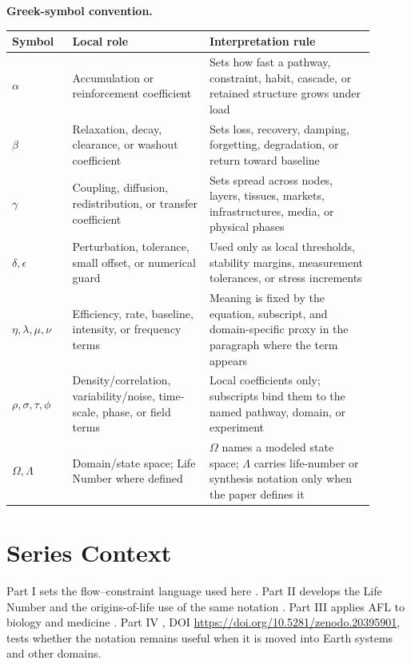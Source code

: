 \documentclass[12pt,a4paper]{article}
\begin{document}
\noindent\textbf{Greek-symbol convention.}
\begin{center}
{\small
\begin{tabular}{p{0.15\linewidth}p{0.34\linewidth}p{0.41\linewidth}}
\hline
Symbol & Local role & Interpretation rule \\
\hline
$\alpha$ & Accumulation or reinforcement coefficient & Sets how fast a pathway, constraint, habit, cascade, or retained structure grows under load \\
$\beta$ & Relaxation, decay, clearance, or washout coefficient & Sets loss, recovery, damping, forgetting, degradation, or return toward baseline \\
$\gamma$ & Coupling, diffusion, redistribution, or transfer coefficient & Sets spread across nodes, layers, tissues, markets, infrastructures, media, or physical phases \\
$\delta,\epsilon$ & Perturbation, tolerance, small offset, or numerical guard & Used only as local thresholds, stability margins, measurement tolerances, or stress increments \\
$\eta,\lambda,\mu,\nu$ & Efficiency, rate, baseline, intensity, or frequency terms & Meaning is fixed by the equation, subscript, and domain-specific proxy in the paragraph where the term appears \\
$\rho,\sigma,\tau,\phi$ & Density/correlation, variability/noise, time-scale, phase, or field terms & Local coefficients only; subscripts bind them to the named pathway, domain, or experiment \\
$\Omega,\Lambda$ & Domain/state space; Life Number where defined & $\Omega$ names a modeled state space; $\Lambda$ carries life-number or synthesis notation only when the paper defines it \\
\hline
\end{tabular}
}
\end{center}

\section{Series Context}

Part I sets the flow--constraint language used here \cite{MujjabiPartI2026}.
Part II develops the Life Number and the origins-of-life use of the same notation
\cite{MujjabiPartII2026}. Part III applies AFL to biology and medicine
\cite{MujjabiPartIII2026}. Part IV \cite{MujjabiPartIV2026}, DOI \url{https://doi.org/10.5281/zenodo.20395901}, tests whether the notation remains useful
when it is moved into Earth systems and other domains.
\end{document}
